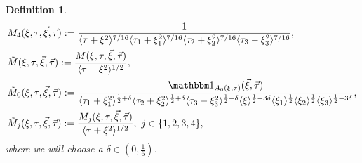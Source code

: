 \documentclass[reqno]{amsart}
\theoremstyle{Definitionl}
\theoremstyle{Definitionk}
\newtheorem{defk}[defi]{Definition}
\theoremstyle{definition}
\theoremstyle{Satzk}
\theoremstyle{Satzl}
\theoremstyle{Bemerkung}
\begin{document}
\begin{defk}
\begin{align*}
&M_4(\xi,\tau,\vec\xi,\vec\tau):= \frac{1}{\langle\tau+\xi^2\rangle^{7/16}\langle\tau_1+\xi_1^2\rangle^{7/16}\langle\tau_2+\xi_2^2\rangle^{7/16}\langle\tau_3-\xi_3^2\rangle^{7/16}},\\
&\tilde M(\xi,\tau,\vec\xi,\vec\tau):= \frac{M(\xi,\tau,\vec\xi,\vec\tau)}{\langle\tau+\xi^2\rangle^{1/2}},\\
&\tilde M_0(\xi,\tau,\vec\xi,\vec\tau):= \frac{\mathbbm1_{A_0(\xi,\tau)}(\vec\xi,\vec\tau)}{\langle\tau_1+\xi_1^2\rangle^{\frac12+\delta}\langle\tau_2+\xi_2^2\rangle^{\frac12+\delta}\langle\tau_3-\xi_3^2\rangle^{\frac12+\delta}\langle\xi\rangle^{\frac12-3\delta}\langle\xi_1\rangle^{\frac12}\langle\xi_2\rangle^{\frac12}\langle\xi_3\rangle^{\frac12-3\delta}},\\
&\tilde M_j(\xi,\tau,\vec\xi,\vec\tau):= \frac{M_j(\xi,\tau,\vec\xi,\vec\tau)}{\langle\tau+\xi^2\rangle^{1/2}},\ j\in\{1,2,3,4\},
\end{align*}
where we will choose a $\delta\in(0,\tfrac16)$.
\end{defk}
\end{document}
